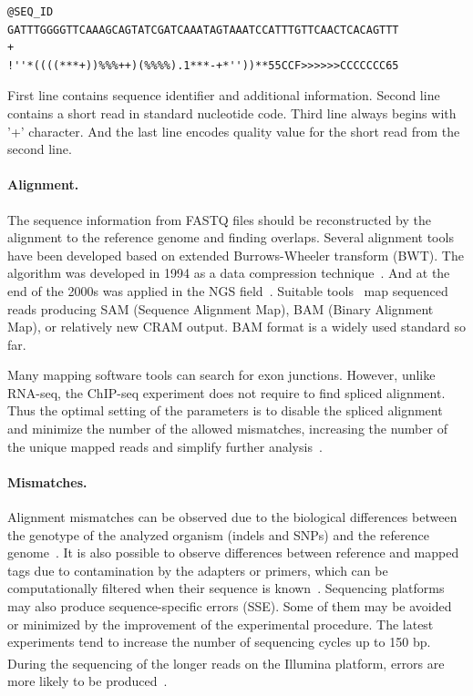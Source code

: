 \begin{verbatim}
@SEQ_ID
GATTTGGGGTTCAAAGCAGTATCGATCAAATAGTAAATCCATTTGTTCAACTCACAGTTT
+
!''*((((***+))%%%++)(%%%%).1***-+*''))**55CCF>>>>>>CCCCCCC65
\end{verbatim}

First line contains sequence identifier and additional information.
Second line contains a short read in standard nucleotide code.
Third line always begins with '+' character.
And the last line encodes quality value for the short read from the second line.


\paragraph{Alignment.}
The sequence information from FASTQ files should be reconstructed by the alignment to the reference genome and finding overlaps.
Several alignment tools have been developed based on extended Burrows-Wheeler transform (BWT). 
The algorithm was developed in 1994 as a data compression technique~\cite{li2009fast, siren2014indexing}.
And at the end of the 2000s was applied in the NGS field~\cite{simpson2010efficient}.
Suitable tools~\cite{langmead2009ultrafast, li2009fast, kim2019graph} map sequenced reads producing  SAM (Sequence Alignment Map), BAM (Binary Alignment Map), or relatively new CRAM output. 
BAM format is a widely used standard so far.

Many mapping software tools can search for exon junctions. 
However, unlike RNA-seq, the ChIP-seq experiment does not require to find spliced alignment.
Thus the optimal setting of the parameters is to disable the spliced alignment and minimize the number of the allowed mismatches, increasing the number of the unique mapped reads and simplify further analysis~\cite{derrien2012fast}.

\paragraph{Mismatches.}
Alignment mismatches can be observed due to the biological differences between the genotype of the analyzed organism (indels and SNPs) and the reference genome~\cite{park2009chip}.
It is also possible to observe differences between reference and mapped tags due to contamination by the adapters or primers, which can be computationally filtered when their sequence is known~\cite{nakamura2011sequence}. 
Sequencing platforms may also produce sequence-specific errors (SSE). 
Some of them may be avoided or minimized by the improvement of the experimental procedure. 
The latest experiments tend to increase the number of sequencing cycles up to 150 bp. 
During the sequencing of the longer reads on the Illumina\textsuperscript{\texttrademark} platform, errors are more likely to be produced~\cite{nakamura2011sequence}.

